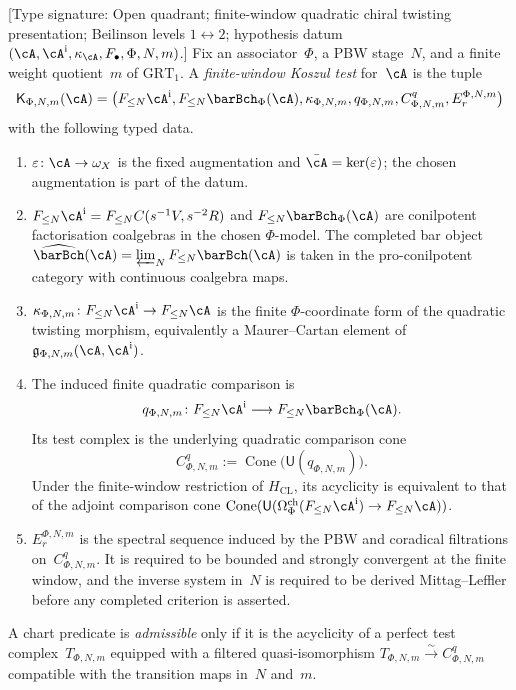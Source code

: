 \begin{definition}
\label{v1-def:kms-finite-window-test}
\ClaimStatusDefinitional
\textup{[Type signature: Open quadrant; finite-window quadratic
chiral twisting presentation; Beilinson levels $1\leftrightarrow2$;
hypothesis datum
$(\cA,\cA^{\mathrm i},\kappa_\cA,F_\bullet,\Phi,N,m)$.]}
Fix an associator~$\Phi$, a PBW stage~$N$, and a finite weight
quotient~$m$ of $\mathrm{GRT}_1$. A \emph{finite-window Koszul
test} for~$\cA$ is the tuple
\[
\mathsf K_{\Phi,N,m}(\cA)=
\bigl(F_{\le N}\cA^{\mathrm i},F_{\le N}\barBch_\Phi(\cA),
\kappa_{\Phi,N,m},q_{\Phi,N,m},
C^q_{\Phi,N,m},E_r^{\Phi,N,m}\bigr)
\]
with the following typed data.
\begin{enumerate}[label=\textup{(\roman*)},leftmargin=2.4em]
\item $\varepsilon\colon \cA\to\omega_X$ is the fixed
 augmentation and
 $\bar\cA=\ker(\varepsilon)$; the chosen augmentation is part of
 the datum.
\item $F_{\le N}\cA^{\mathrm i}=F_{\le N}C(s^{-1}V,s^{-2}R)$ and
 $F_{\le N}\barBch_\Phi(\cA)$ are conilpotent factorisation
 coalgebras in the chosen $\Phi$-model.  The completed bar object
 $\widehat{\barBch}(\cA)=\varprojlim_NF_{\le N}\barBch(\cA)$ is
 taken in the pro-conilpotent category with continuous coalgebra
 maps.
\item
 $\kappa_{\Phi,N,m}\colon F_{\le N}\cA^{\mathrm i}\to
 F_{\le N}\cA$
 is the finite $\Phi$-coordinate form of the quadratic twisting
 morphism, equivalently a
 Maurer--Cartan element of
 $\mathfrak g_{\Phi,N,m}(\cA,\cA^{\mathrm i})$.
\item The induced finite quadratic comparison is
 \[
 q_{\Phi,N,m}\colon F_{\le N}\cA^{\mathrm i}
 \longrightarrow F_{\le N}\barBch_\Phi(\cA).
 \]
 Its test complex is the underlying quadratic comparison cone
 \[
 C^q_{\Phi,N,m}:=
 \operatorname{Cone}\bigl(\mathsf U(q_{\Phi,N,m})\bigr).
 \]
 Under the finite-window restriction of $H_{\mathrm{CL}}$, its
 acyclicity is equivalent to that of the adjoint comparison cone
 $\operatorname{Cone}(\mathsf U(\Omega^{\mathrm{ch}}_\Phi
 (F_{\le N}\cA^{\mathrm i})\to F_{\le N}\cA))$.
\item $E_r^{\Phi,N,m}$ is the spectral sequence induced by the
 PBW and coradical filtrations on~$C^q_{\Phi,N,m}$. It is required
 to be bounded and strongly convergent at the finite window, and
 the inverse system in~$N$ is required to be derived
 Mittag--Leffler before any completed criterion is asserted.
\end{enumerate}
A chart predicate is \emph{admissible} only if it is the
acyclicity of a perfect test complex~$T_{\Phi,N,m}$ equipped
with a filtered quasi-isomorphism
$T_{\Phi,N,m}\xrightarrow{\sim}C^q_{\Phi,N,m}$ compatible with
the transition maps in~$N$ and~$m$.
\end{definition}


